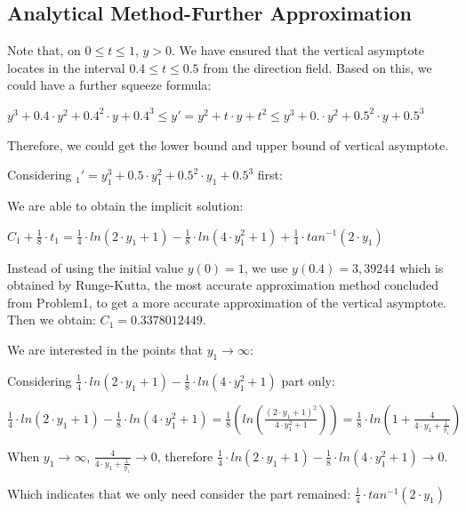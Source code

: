 \documentclass[11pt,a4paper]{article}
\begin{document}
\subsection{Analytical Method-Further Approximation}

Note that, on $0 \leq t \leq 1$, $y > 0$. We have ensured that the vertical asymptote locates in the interval $0.4 \leq t \leq 0.5$ from the direction field. Based on this, we could have a further squeeze formula: 

\begin{center}
	$y^3+0.4 \cdot y^2 + 0.4^2 \cdot y + 0.4^3 \leq y' = y^2+t \cdot y + t^2 \leq y^3 + 0. \cdot y^2 + 0.5^2 \cdot y + 0.5^3$
\end{center}

Therefore, we could get the lower bound and upper bound of vertical asymptote. 

Considering $_1'=y_1^3+0.5 \cdot y_1^2 + 0.5^2 \cdot y_1 + 0.5^3$ first:

We are able to obtain the implicit solution:

\begin{center}
	$C_1+\frac{1}{8} \cdot t_1 = \frac{1}{4} \cdot ln(2 \cdot y_1+1)- \frac{1}{8}\cdot ln(4\cdot y_1^2+1)+\frac{1}{4}\cdot tan^{-1}(2 \cdot y_1)$
\end{center}

Instead of using the initial value $y(0)=1$, we use $y(0.4)=3,39244$ which is obtained by Runge-Kutta, the most accurate approximation method concluded from Problem1, to get a more accurate approximation of the vertical asymptote. Then we obtain: $C_1=0.3378012449$.

We are interested in the points that $y_1 \rightarrow \infty$:

Considering $\frac{1}{4} \cdot ln(2 \cdot y_1 + 1)-\frac{1}{8}\cdot ln(4 \cdot y_1^2+1)$ part only:

\begin{center}
	$\frac{1}{4} \cdot ln(2\cdot y_1 + 1)- \frac{1}{8}\cdot ln(4\cdot y_1^2+1) = \frac{1}{8}(ln(\frac{(2\cdot y_1+1)^2}{4\cdot y_1^2+1}))=\frac{1}{8}\cdot ln(1+\frac{4}{4\cdot y_1+\frac{1}{y_1}})$
\end{center}

When $y_1 \rightarrow \infty$, $\frac{4}{4\cdot y_1+\frac{1}{y_1}}\rightarrow 0$, therefore $\frac{1}{4} \cdot ln(2 \cdot y_1 + 1)-\frac{1}{8}\cdot ln(4\cdot y_1^2+1) \rightarrow 0$.

Which indicates that we only need consider the part remained: $\frac{1}{4} \cdot tan^{-1}(2\cdot y_1)$
\end{document}
